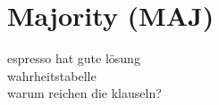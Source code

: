 \section{Majority (MAJ)}


espresso hat gute lösung\\
wahrheitstabelle\\
warum reichen die klauseln?